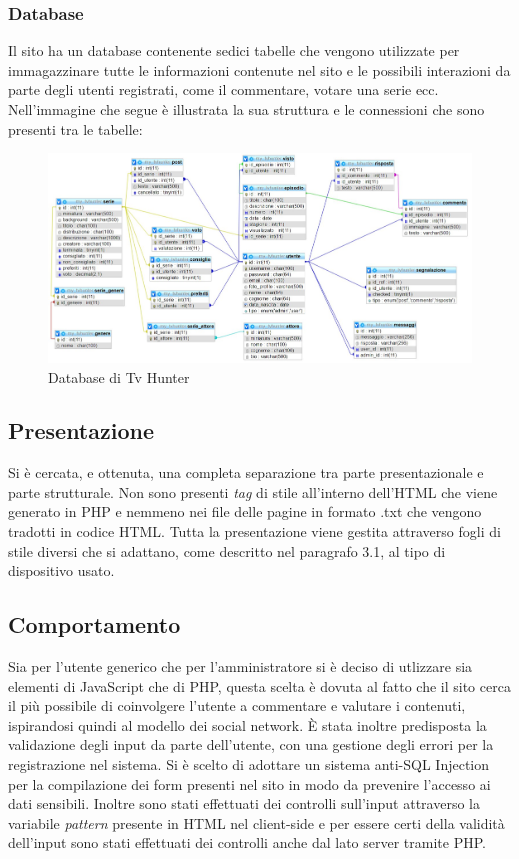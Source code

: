\subsubsection{Database}

Il sito ha un database contenente  sedici tabelle che vengono utilizzate per immagazzinare  tutte le informazioni contenute nel sito e le possibili interazioni da parte degli utenti registrati, come il commentare, votare una serie ecc. Nell'immagine che segue è illustrata la  sua struttura e le connessioni che sono presenti tra le tabelle:

\begin{figure}[H]
	\centerline{\includegraphics[scale= 0.40]{img/database.jpg}}
	\caption{Database di Tv Hunter}
\end{figure}

\subsection{Presentazione}
Si è cercata, e ottenuta, una completa separazione tra parte presentazionale e parte strutturale. Non sono presenti \textit{tag} di stile all’interno dell'HTML che viene generato in PHP e nemmeno nei file delle pagine in formato .txt che vengono tradotti in codice HTML. 
Tutta la presentazione viene gestita attraverso fogli di stile diversi che si adattano, come descritto nel paragrafo 3.1, al tipo di dispositivo usato.

\subsection{Comportamento}
Sia per l'utente generico che per l'amministratore si è deciso di utlizzare sia elementi di JavaScript che di PHP, questa scelta è dovuta al fatto che il sito cerca il più possibile di coinvolgere l'utente a commentare e valutare i contenuti, ispirandosi quindi al modello dei social network. È stata inoltre predisposta la validazione degli input da parte dell’utente, con una gestione degli errori per la registrazione nel sistema. Si è scelto di adottare un sistema anti-SQL Injection per la compilazione dei form presenti nel sito in modo da prevenire l'accesso ai dati sensibili. Inoltre sono stati effettuati dei controlli sull'input attraverso la variabile \textit{pattern} presente in HTML nel client-side e per essere certi della validità dell'input sono stati effettuati dei controlli anche dal lato server tramite PHP.


